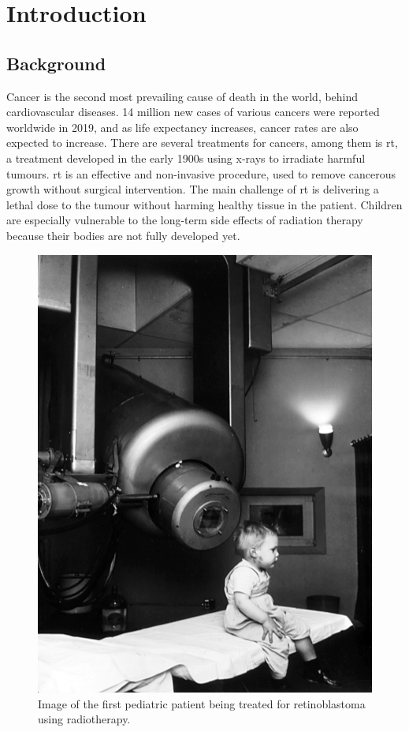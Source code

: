 \documentclass[main.tex]{subfiles}
\begin{document}
\section{Introduction}

\subsection{Background}

Cancer is the second most prevailing cause of death in the world, behind cardiovascular diseases. 14 million new cases of various cancers were reported worldwide in 2019, and as life expectancy increases, cancer rates are also expected to increase\cite{cancer_number}. There are several treatments for cancers, among them is \gls{rt}, a treatment developed in the early 1900s using x-rays to irradiate harmful tumours. \gls{rt} is an effective and non-invasive procedure, used to remove cancerous growth without surgical intervention. The main challenge of \gls{rt} is delivering a lethal dose to the tumour without harming healthy tissue in the patient. Children are especially vulnerable to the long-term side effects of radiation therapy because their bodies are not fully developed yet.

\begin{figure}[!ht]
    \centering
    \includegraphics[scale = 0.4]{images/rt_intro.jpg}
    \caption{Image of the first pediatric patient being treated for retinoblastoma using radiotherapy.\cite{rt_intro}}
    \label{fig: rt_intro}
\end{figure}
\FloatBarrier
\end{document}
